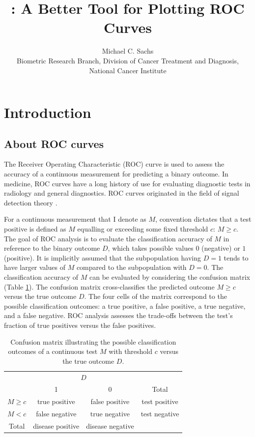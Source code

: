 \documentclass[codesnippet]{jss}
\author{		Michael C. Sachs\\Biometric Research Branch, Division of Cancer Treatment and Diagnosis,
National Cancer Institute		}
\title{\pkg{plotROC}: A Better Tool for Plotting ROC Curves}
\begin{document}
\section{Introduction}\label{introduction}

\subsection{About ROC curves}\label{about-roc-curves}

The Receiver Operating Characteristic (ROC) curve is used to assess the
accuracy of a continuous measurement for predicting a binary outcome. In
medicine, ROC curves have a long history of use for evaluating
diagnostic tests in radiology and general diagnostics. ROC curves
originated in the field of signal detection theory .

For a continuous measurement that I denote as \(M\), convention dictates
that a test positive is defined as \(M\) equalling or exceeding some
fixed threshold \(c\): \(M \geq c\). The goal of ROC analysis is to
evaluate the classification accuracy of \(M\) in reference to the binary
outcome \(D\), which takes possible values \(0\) (negative) or \(1\)
(positive). It is implicitly assumed that the subpopulation having
\(D = 1\) tends to have larger values of \(M\) compared to the
subpopulation with \(D = 0\). The classification accuracy of \(M\) can
be evaluated by considering the confusion matrix (Table \ref{confus}).
The confusion matrix cross-classifies the predicted outcome \(M \geq c\)
versus the true outcome \(D\). The four cells of the matrix correspond
to the possible classification outcomes: a true positive, a false
positive, a true negative, and a false negative. ROC analysis assesses
the trade-offs between the test's fraction of true positives versus the
false positives.

\begin{table}
\begin{tabular}{l|c|c|c}
\multicolumn{1}{c}{}&\multicolumn{2}{c}{$D$}&\\
\cline{2-3}
\multicolumn{1}{c|}{}&1&0&\multicolumn{1}{c}{Total}\\
\cline{2-3}
 $M \geq c$ & true positive & false positive & test positive\\
\cline{2-3}
 $M < c$ & false negative & true negative & test negative\\
\cline{2-3}
\multicolumn{1}{c}{Total} & \multicolumn{1}{c}{disease positive} & \multicolumn{1}{c}{disease negative} & \multicolumn{1}{c}{}\\
\end{tabular}
\caption{\label{confus} Confusion matrix illustrating the possible classification outcomes of a continuous test $M$ with threshold $c$ versus the true outcome $D$. }
\end{table}
\end{document}
